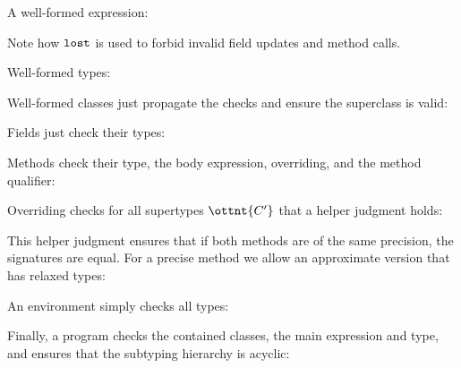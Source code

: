 A well-formed expression:

\vspace{0.5ex}
\ottdefntyperules{}
\vspace{2.0ex}


Note how $ \texttt{\upshape{lost}\,\!} $ is used to forbid invalid field updates and method
calls.


Well-formed types:

\vspace{0.5ex}
\ottdefnwftype{}
\vspace{2.0ex}


Well-formed classes just propagate the checks and ensure the
superclass is valid:

\vspace{0.5ex}
\ottdefnwfclass{}
\vspace{2.0ex}


Fields just check their types:

\vspace{0.5ex}
\ottdefnwffd{}
\vspace{2.0ex}


Methods check their type, the body expression, overriding, and the
method qualifier:

\vspace{0.5ex}
\ottdefnwfmd{}
\vspace{2.0ex}


Overriding checks for all supertypes $\ottnt{C'}$ that a helper judgment
holds:

\vspace{0.5ex}
\ottdefnoverride{}
\vspace{2.0ex}


This helper judgment ensures that if both methods are of the same
precision, the signatures are equal. For a precise method we allow an
approximate version that has relaxed types:

\vspace{0.5ex}
\ottdefnoverrideaux{}
\vspace{2.0ex}

An environment simply checks all types:

\vspace{0.5ex}
\ottdefnswfenv{}
\vspace{2.0ex}


Finally, a program checks the contained classes, the main expression
and type, and ensures that the subtyping hierarchy is acyclic:

\vspace{0.5ex}
\ottdefnwfprg{}
\vspace{2.0ex}



